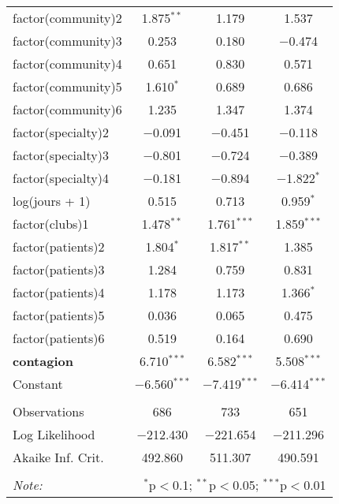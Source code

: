 \documentclass[11pt]{article}
\begin{document}
\begin{table}[!htbp]
\begin{tabular}{@{\extracolsep{5pt}}lccc}
  factor(community)2 & 1.875$^{**}$ & 1.179 & 1.537 \\ 
  factor(community)3 & 0.253 & 0.180 & $-$0.474 \\ 
  factor(community)4 & 0.651 & 0.830 & 0.571 \\ 
  factor(community)5 & 1.610$^{*}$ & 0.689 & 0.686 \\ 
  factor(community)6 & 1.235 & 1.347 & 1.374 \\ 
  factor(specialty)2 & $-$0.091 & $-$0.451 & $-$0.118 \\ 
  factor(specialty)3 & $-$0.801 & $-$0.724 & $-$0.389 \\ 
  factor(specialty)4 & $-$0.181 & $-$0.894 & $-$1.822$^{*}$ \\ 
  log(jours + 1) & 0.515 & 0.713 & 0.959$^{*}$ \\ 
  factor(clubs)1 & 1.478$^{**}$ & 1.761$^{***}$ & 1.859$^{***}$ \\ 
  factor(patients)2 & 1.804$^{*}$ & 1.817$^{**}$ & 1.385 \\ 
  factor(patients)3 & 1.284 & 0.759 & 0.831 \\ 
  factor(patients)4 & 1.178 & 1.173 & 1.366$^{*}$ \\ 
  factor(patients)5 & 0.036 & 0.065 & 0.475 \\ 
  factor(patients)6 & 0.519 & 0.164 & 0.690 \\ 
 \textbf{contagion} & 6.710$^{***}$ & 6.582$^{***}$ & 5.508$^{***}$ \\ 
  Constant & $-$6.560$^{***}$ & $-$7.419$^{***}$ & $-$6.414$^{***}$ \\ 
 \hline \\[-1.8ex] 
Observations & 686 & 733 & 651 \\ 
Log Likelihood & $-$212.430 & $-$221.654 & $-$211.296 \\ 
Akaike Inf. Crit. & 492.860 & 511.307 & 490.591 \\ 
\hline 
\hline \\[-1.8ex] 
\textit{Note:}  & \multicolumn{3}{r}{$^{*}$p$<$0.1; $^{**}$p$<$0.05; $^{***}$p$<$0.01} \\ 
\end{tabular} 
\end{table} 
\end{document}

